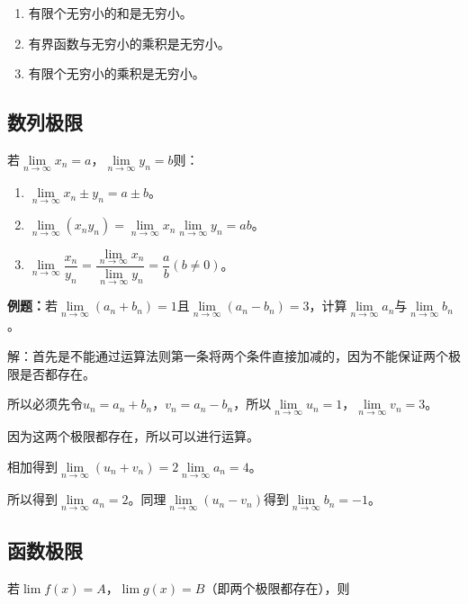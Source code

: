 \documentclass[UTF8, 12pt]{ctexart}
\begin{document}
\begin{enumerate}
    \item 有限个无穷小的和是无穷小。
    \item 有界函数与无穷小的乘积是无穷小。
    \item 有限个无穷小的乘积是无穷小。
\end{enumerate}

\subsection{数列极限}

若$\lim\limits_{n\to\infty}x_n=a$，$\lim\limits_{n\to\infty}y_n=b$则：

\begin{enumerate}
    \item $\lim\limits_{n\to\infty}x_n\pm y_n=a\pm b$。
    \item $\lim\limits_{n\to\infty}(x_ny_n)=\lim\limits_{n\to\infty}x_n\lim\limits_{n\to\infty}y_n=ab$。
    \item $\lim\limits_{n\to\infty}\dfrac{x_n}{y_n}=\dfrac{\lim\limits_{n\to\infty}x_n}{\lim\limits_{n\to\infty}y_n}=\dfrac{a}{b}(b\neq 0)$。
\end{enumerate}

\textbf{例题：}若$\lim\limits_{n\to\infty}(a_n+b_n)=1$且$\lim\limits_{n\to\infty}(a_n-b_n)=3$，计算$\lim\limits_{n\to\infty}a_n$与$\lim\limits_{n\to\infty}b_n$。

解：首先是不能通过运算法则第一条将两个条件直接加减的，因为不能保证两个极限是否都存在。

所以必须先令$u_n=a_n+b_n$，$v_n=a_n-b_n$，所以$\lim\limits_{n\to\infty}u_n=1$，$\lim\limits_{n\to\infty}v_n=3$。

因为这两个极限都存在，所以可以进行运算。

相加得到$\lim\limits_{n\to\infty}(u_n+v_n)=2\lim\limits_{n\to\infty}a_n=4$。

所以得到$\lim\limits_{n\to\infty}a_n=2$。同理$\lim\limits_{n\to\infty}(u_n-v_n)$得到$\lim\limits_{n\to\infty}b_n=-1$。

\subsection{函数极限}

若$\lim f(x)=A$，$\lim g(x)=B$（即两个极限都存在），则
\end{document}
